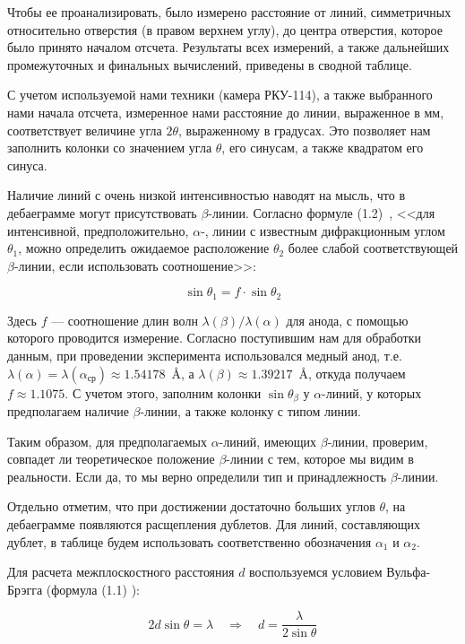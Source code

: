 \documentclass[a4paper, 12pt]{article}
\newcommand{\qrq}
{\ensuremath{\quad \Rightarrow \quad}} %
\begin{document}
Чтобы ее проанализировать, было измерено расстояние от линий, симметричных относительно отверстия (в правом верхнем углу), до центра отверстия, которое было принято началом отсчета. Результаты всех измерений, а также дальнейших промежуточных и финальных вычислений, приведены в сводной таблице.

С учетом используемой нами техники (камера РКУ-114), а также выбранного нами начала отсчета, измеренное нами расстояние до линии, выраженное в мм, соответствует величине угла $2 \theta$, выраженному в градусах. Это позволяет нам заполнить колонки со значением угла $\theta$, его синусам, а также квадратом его синуса.

Наличие линий с очень низкой интенсивностью наводят на мысль, что в дебаеграмме могут присутствовать $\beta$-линии. Согласно формуле (1.2)~\cite{Practicum}, <<для интенсивной, предположительно, $\alpha$-, линии с известным дифракционным углом $\theta_1$, можно определить ожидаемое расположение $\theta_2$ более слабой соответствующей $\beta$-линии, если использовать соотношение>>:

\begin{equation}
	\sin\theta_1 = f \cdot \sin\theta_2
\end{equation}

Здесь $f$ --- соотношение длин волн $\lambda(\beta) / \lambda(\alpha)$ для анода, с помощью которого проводится измерение. Согласно поступившим нам для обработки данным, при проведении эксперимента использовался медный анод, т.е. $\lambda(\alpha) = \lambda(\alpha_\text{ср}) \approx 1.54178$~\AA, а $\lambda(\beta) \approx 1.39217$~\AA, откуда получаем $f\approx 1.1075$. С учетом этого, заполним колонки $\sin\theta_\beta$ у $\alpha$-линий, у которых предполагаем наличие $\beta$-линии, а также колонку с типом линии.

Таким образом, для предполагаемых $\alpha$-линий, имеющих $\beta$-линии, проверим, совпадет ли теоретическое положение $\beta$-линии с тем, которое мы видим в реальности. Если да, то мы верно определили тип и принадлежность $\beta$-линии.

Отдельно отметим, что при достижении достаточно больших углов $\theta$, на дебаеграмме появляются расщепления дублетов. Для линий, составляющих дублет, в таблице будем использовать соответственно обозначения $\alpha_1$ и $\alpha_2$.

Для расчета межплоскостного расстояния $d$ воспользуемся условием Вульфа-Брэгга (формула (1.1) \cite{Practicum}):

\begin{equation}
	2 d \sin\theta = \lambda \qrq d = \frac{\lambda}{2 \sin \theta}
\end{equation}
\end{document}
